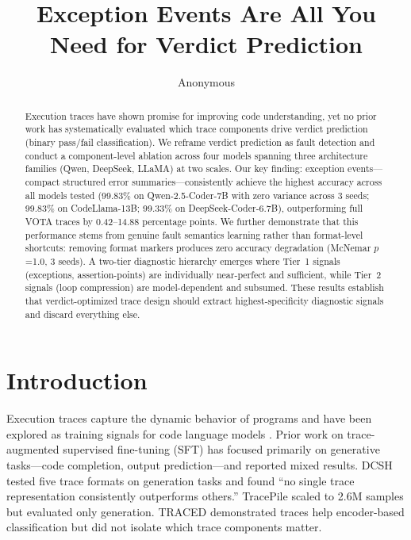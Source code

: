 \documentclass[11pt,a4paper]{article}
\title{Exception Events Are All You Need for Verdict Prediction}
\author{Anonymous}
\date{}
\begin{document}
\maketitle

\begin{abstract}
Execution traces have shown promise for improving code understanding, yet no prior work has systematically evaluated which trace components drive verdict prediction (binary pass/fail classification). We reframe verdict prediction as fault detection and conduct a component-level ablation across four models spanning three architecture families (Qwen, DeepSeek, LLaMA) at two scales. Our key finding: exception events---compact structured error summaries---consistently achieve the highest accuracy across all models tested (99.83\% on Qwen-2.5-Coder-7B with zero variance across 3 seeds; 99.83\% on CodeLlama-13B; 99.33\% on DeepSeek-Coder-6.7B), outperforming full VOTA traces by 0.42--14.88 percentage points. We further demonstrate that this performance stems from genuine fault semantics learning rather than format-level shortcuts: removing format markers produces zero accuracy degradation (McNemar $p$=1.0, 3 seeds). A two-tier diagnostic hierarchy emerges where Tier~1 signals (exceptions, assertion-points) are individually near-perfect and sufficient, while Tier~2 signals (loop compression) are model-dependent and subsumed. These results establish that verdict-optimized trace design should extract highest-specificity diagnostic signals and discard everything else.
\end{abstract}

\section{Introduction}

Execution traces capture the dynamic behavior of programs and have been explored as training signals for code language models \cite{ni2024next,jain2024tracepile}. Prior work on trace-augmented supervised fine-tuning (SFT) has focused primarily on generative tasks---code completion, output prediction---and reported mixed results. DCSH \cite{ni2024next} tested five trace formats on generation tasks and found ``no single trace representation consistently outperforms others.'' TracePile \cite{jain2024tracepile} scaled to 2.6M samples but evaluated only generation. TRACED \cite{dinella2022traced} demonstrated traces help encoder-based classification but did not isolate which trace components matter.
\end{document}
